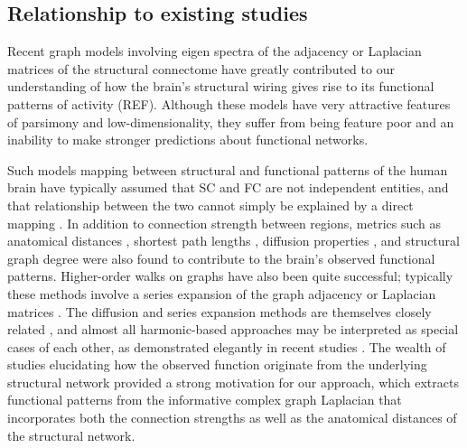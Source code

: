 \documentclass{article}
\begin{document}
\subsection{Relationship to existing studies}

Recent graph models involving eigen spectra of the adjacency or Laplacian matrices of the structural connectome have greatly contributed to our understanding of how the brain's structural wiring gives rise to its functional patterns of activity (REF). Although these models have very attractive features of parsimony and low-dimensionality, they suffer from being feature poor and an inability to make stronger predictions about functional networks. 

Such models mapping between structural and functional patterns of the human brain have typically assumed that SC and FC are not independent entities, and that relationship between the two cannot simply be explained by a direct mapping \cite{Honey2009}. In addition to connection strength between regions, metrics such as anatomical distances \cite{alexander-bloch_anatomical_2013}, shortest path lengths \cite{goni_resting-brain_2014}, diffusion properties \cite{Abdelnour2018, Kuceyeski2016}, and structural graph degree \cite{stam_relation_2016} were also found to contribute to the brain's observed functional patterns. Higher-order walks on graphs have also been quite successful; typically these methods involve a series expansion of the graph adjacency or Laplacian matrices \cite{Meier2016, Becker2018}. The diffusion and series expansion methods are themselves closely related \cite{robinson_eigenmodes_2016}, and almost all harmonic-based approaches may be interpreted as special cases of each other, as demonstrated elegantly in recent studies \cite{deslauriers2020, tewarie2020}.  The wealth of studies elucidating how the observed function originate from the underlying structural network provided a strong motivation for our approach, which extracts functional patterns from the informative complex graph Laplacian that incorporates both the connection strengths as well as the anatomical distances of the structural network. 
\end{document}
